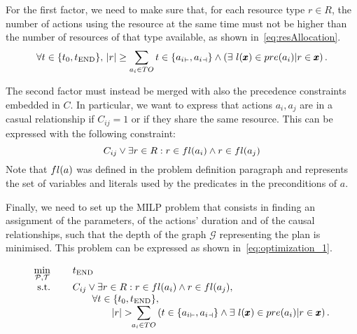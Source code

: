 For the first factor, we need to make sure that, for each resource type $r\in R$, the number of actions using the resource at the same time must not be higher than the number of resources of that type available, as shown in~\autoref{eq:resAllocation}.
\begin{equation}
    \displaystyle\forall t \in\{t_0, t_{\tn{END}}\},\,\vert r\vert \geq\sum_{a_i\in TO} t\in\{\aStart{a_i}, \aEnd{a_i}\} \wedge \left( \exists~l(\pmb{x})\in \pc{a_i}\vert r\in\pmb{x}\right).
    \label{eq:resAllocation}
\end{equation}

The second factor must instead be merged with also the precedence constraints embedded in $C$. In particular, we want to express that actions $a_i, a_j$ are in a casual relationship if $C_{ij}=1$ or if they share the same resource. This can be expressed with the following constraint: 
\begin{equation}
    C_{ij} \vee \exists r\in R : r\in fl(a_i) \wedge r\in fl(a_j)
    \label{eq:precedence}
\end{equation}
Note that $fl(a)$ was defined in the problem definition paragraph and represents the set of variables and literals used by the predicates in the preconditions of $a$. 

Finally, we need to set up the MILP problem that consists in finding an assignment of the parameters, of the actions' duration and of the causal relationships, such that the depth of the graph $\mathcal{G}$ representing the plan is minimised. This problem can be expressed as shown in~\autoref{eq:optimization_1}.

    \begin{equation}
    \everymath={\displaystyle}
    \begin{array}{r@{\hspace*{8mm}}l}
        \label{eq:optimization_1}
        \min_{\mathcal{P}, \mathcal{T}} & t_{\tn{END}} \\
        \textrm{s.t.}   & C_{ij} \vee \exists r\in R : r\in\fl{a_i} \wedge r\in\fl{a_j}, \\
                              & \quad \quad \forall t \in\{t_0, t_{\tn{END}}\}, \\
                              & \quad \quad \quad \quad \vert r\vert > \!\!\sum_{a_i\in TO} \left(t\in\{\aStart{a_i}, \aEnd{a_i}\} \wedge \exists~l(\pmb{x})\in \pc{a_i}\vert r\in\pmb{x}\right).\\
    \end{array}
    \end{equation}

